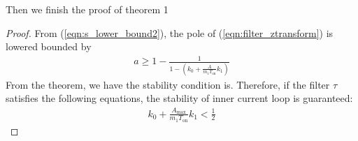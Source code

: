 


Then we finish the proof of theorem 1
\begin{proof}
From (\ref{eqn:s_lower_bound2}), the pole of (\ref{eqn:filter_ztransform}) is lowered bounded by
\begin{align}
    a \ge  1 - \frac{1}{1 - (k_0 + \frac{A}{m_1 T_{\text{on}}} k_1 )}
\end{align}
From the theorem, we have the stability condition is. Therefore, if the filter $\tau$ satisfies the following equations, the stability of inner current loop is guaranteed: 
\begin{align}
    k_0 + \frac{A_{\text{max}}}{m_1 T_{\text{on}}} k_1 < \frac{1}{2}
\end{align}
\end{proof}

